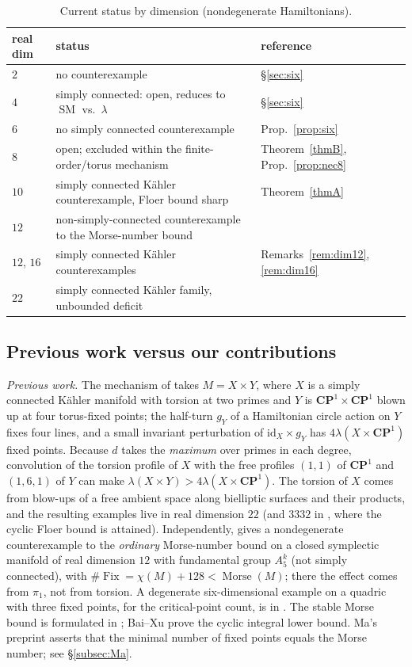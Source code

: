 \documentclass[11pt]{amsart}
\numberwithin{equation}{section}
\theoremstyle{definition}
\theoremstyle{remark}
\newcommand{\CP}{\mathbf{CP}}
\DeclareMathOperator{\SM}{SM}
\DeclareMathOperator{\Morse}{Morse}
\DeclareMathOperator{\Fix}{Fix}
\newcommand{\id}{\mathrm{id}}
\begin{document}
\begin{table}[h]
\centering\small
\begin{tabular}{@{}lll@{}}
\toprule
real dim & status & reference\\
\midrule
$2$ & no counterexample & \S\ref{sec:six}\\
$4$ & simply connected: open, reduces to $\SM$ vs.\ $\lambda$ & \S\ref{sec:six}\\
$6$ & no simply connected counterexample & Prop.~\ref{prop:six}\\
$8$ & open; excluded within the finite-order/torus mechanism & Theorem~\ref{thmB}, Prop.~\ref{prop:nec8}\\
$10$ & simply connected K\"ahler counterexample, Floer bound sharp & Theorem~\ref{thmA}\\
$12$ & non-simply-connected counterexample to the Morse-number bound & \cite{OpenAISept23}\\
$12$, $16$ & simply connected K\"ahler counterexamples & Remarks~\ref{rem:dim12}, \ref{rem:dim16}\\
$22$ & simply connected K\"ahler family, unbounded deficit & \cite{OpenAI22}\\
\bottomrule
\end{tabular}
\caption{Current status by dimension (nondegenerate Hamiltonians).}
\label{tab:status}
\end{table}

\subsection{Previous work versus our contributions}
\emph{Previous work.} The mechanism of \cite{OpenAIStable,OpenAI22,OpenAICompanion}
takes $M=X\times Y$, where $X$ is a simply connected K\"ahler manifold
with torsion at two primes and $Y$ is $\CP^1\times\CP^1$ blown up at four
torus-fixed points; the half-turn $g_Y$ of a Hamiltonian circle action on $Y$
fixes four lines, and a small invariant perturbation of $\id_X\times g_Y$
has $4\lambda(X\times\CP^1)$ fixed points. Because $d$ takes the
\emph{maximum} over primes in each degree, convolution of the torsion
profile of $X$ with the free profiles $(1,1)$ of $\CP^1$ and $(1,6,1)$ of
$Y$ can make $\lambda(X\times Y)>4\lambda(X\times\CP^1)$. The torsion of
$X$ comes from blow-ups of a free ambient space along bielliptic surfaces
and their products, and the resulting examples live in real dimension
$22$ \cite{OpenAI22} (and $3332$ in \cite{OpenAICompanion}, where the
cyclic Floer bound is attained). Independently, \cite[Thm.~1.1]{OpenAISept23}
gives a nondegenerate counterexample to the \emph{ordinary} Morse-number
bound on a closed symplectic manifold of real dimension $12$ with
fundamental group $A_5^k$ (not simply connected), with
$\#\Fix=\chi(M)+128<\Morse(M)$; there the effect comes from $\pi_1$, not
from torsion. A degenerate six-dimensional example on a quadric with three
fixed points, for the critical-point count, is in \cite{OpenAIDegenerate}.
The stable Morse bound is formulated in \cite{Golovko2020}; Bai--Xu
\cite{BaiXu2022,BaiXu2026} prove the cyclic integral lower bound. Ma's
preprint \cite[Thm.~1.5]{Ma2013} asserts that the minimal number of fixed
points equals the Morse number; see \S\ref{subsec:Ma}.
\end{document}
